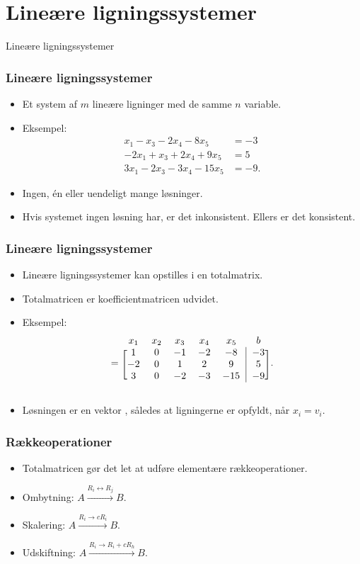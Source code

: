\section{Lineære ligningssystemer}
\begin{frame}
\centering
\Huge
Lineære ligningssystemer
\end{frame}
%
\begin{frame}
\frametitle{Lineære ligningssystemer}
\begin{itemize}
\item Et system af $m$ lineære ligninger med de samme $n$ variable. 
\item Eksempel:
\begin{align*}
x_1-x_3-2x_4-8x_5&=-3 \\
-2x_1+x_3+2x_4+9x_5&=5 \\
3x_1-2x_3-3x_4-15x_5&=-9.
\end{align*}
\item Ingen, én eller uendeligt mange løsninger. 
\item Hvis systemet ingen løsning har, er det inkonsistent. Ellers er det konsistent. 
\end{itemize}
\end{frame}
\begin{frame}
\frametitle{Lineære ligningssystemer}
\begin{itemize}
\item Lineære ligningssystemer kan opstilles i en totalmatrix. 
\item Totalmatricen er koefficientmatricen udvidet. 
\item Eksempel:
\begin{equation*}
  [A \mid \mathbf{b}] =
\begin{blockarray}{ccccccc}
x_1 & x_2 & x_3 & x_4 & x_5 & b \\
\begin{block}{[ccccc|c]c}
  1 & 0 & -1 & -2 & -8 & -3 \\
  -2 & 0 & 1 & 2 & 9 & 5 \\
  3 & 0 & -2 & -3 & -15 & -9 \\
\end{block}
\end{blockarray}.
\end{equation*}
\item Løsningen er en vektor , således at ligningerne er opfyldt, når $x_i = v_i$.
\end{itemize}
\end{frame}
\begin{frame}
\frametitle{Rækkeoperationer}
\begin{itemize}
\item Totalmatricen gør det let at udføre elementære rækkeoperationer. 
\item Ombytning: $A \xrightarrow{R_i \leftrightarrow R_j} B$. 
\item Skalering: $A \xrightarrow{R_i \rightarrow cR_i} B$.
\item Udskiftning: $A \xrightarrow{R_i \rightarrow R_i + cR_h} B$.
\end{itemize}
\end{frame}
